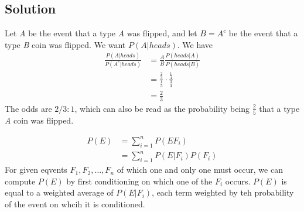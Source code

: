 \subsection*{Solution}
Let \textit{A} be the event that a type \textit{A} was flipped, and let $B=A^c$ be the event that a type \textit{B} coin was flipped. We want $P(A|heads)$. We have
\begin{equation*}
    \begin{split}
        \frac{P(A|heads)}{P(A^c|heads)} &= \frac{A}{B} \frac{P(heads|A)}{P(heads|B)}\\
        &= \frac{\frac{2}{3}}{\frac{1}{3}}\cdot\frac{\frac{1}{4}}{\frac{3}{4}}\\
        &= \frac{2}{3}
    \end{split}
\end{equation*}
The odds are $2/3:1$, which can also be read as the probability being $\frac{2}{5}$ that a type \textit{A} coin was flipped.
\begin{theorem}
\begin{equation}
    \begin{split}
        P(E) & =\sum^n_{i=1} P(EF_i)\\
        &= \sum^n_{i=1} P(E|F_i)P(F_i)
    \end{split}
\end{equation}
For given eqvents $F_1,F_2,\dots, F_n$ of which one and only one must occur, we can compute $P(E)$ by first conditioning on which one of the $F_i$ occurs. $P(E)$ is equal to a weighted average of $P(E|F_i)$, each term weighted by teh probability of the event on whcih it is conditioned. 
\end{theorem}
